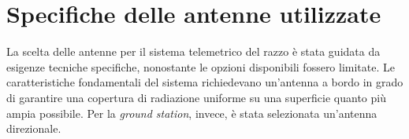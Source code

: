 \documentclass[12pt,a4paper,twoside]{book}
\begin{document}
\begin{table}[H]
    \centering
    \caption{Caratteristiche tecniche del modulo \ac{LoRa} EByte E220-900T22D.}
    \label{tab:LoRa-E220-specs}
\end{table}

\section{Specifiche delle antenne utilizzate} \label{sec:antennas}
La scelta delle antenne per il sistema telemetrico del razzo è stata guidata da
esigenze tecniche specifiche, nonostante le opzioni disponibili fossero limitate.
Le caratteristiche fondamentali del sistema richiedevano un'antenna a bordo in
grado di garantire una copertura di radiazione uniforme su una superficie quanto
più ampia possibile. Per la \emph{ground station}, invece, è stata selezionata
un'antenna direzionale.
\end{document}
